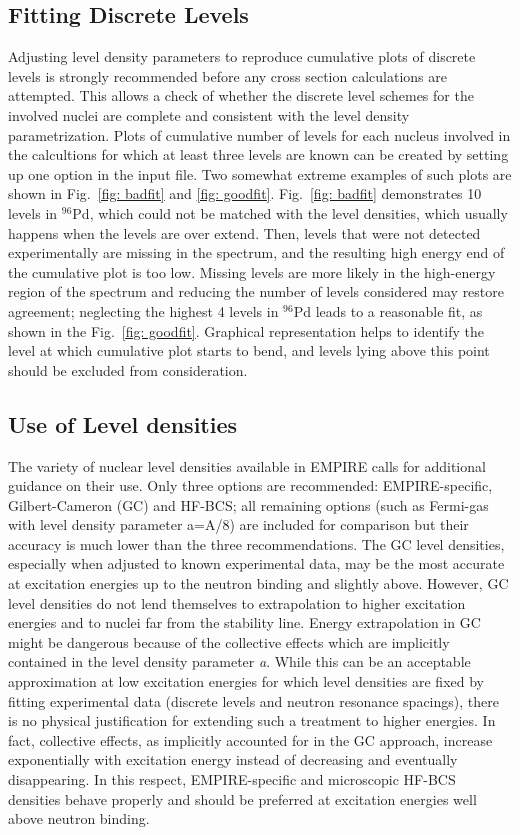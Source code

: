 \documentclass[twocolumn,amsmath,amssymb,10pt,groupedaddress,a4paper]{revtex4}
\begin{document}
\subsection{Fitting Discrete Levels}
Adjusting level density parameters to reproduce cumulative plots of discrete levels is strongly recommended before any cross section calculations are attempted. This allows a check of whether the discrete level schemes for the involved nuclei are complete and consistent with the level density parametrization. Plots of cumulative number of levels for each nucleus involved in the calcultions for which at least three levels are known can be created by setting up one option in the input file. Two somewhat extreme examples of such plots are shown in Fig.~\ref{fig: badfit} and \ref{fig: goodfit}. Fig.~\ref{fig: badfit} demonstrates 10 levels in $^{96}$Pd, which could not be matched with the level densities, which usually happens when the levels are over extend. Then, levels that were not detected experimentally are missing in the spectrum, and the resulting high energy end of the cumulative plot is too low. Missing levels are more likely in the high-energy region of the spectrum and reducing the number of levels considered may restore agreement; neglecting the highest 4 levels in $^{96}$Pd leads to a reasonable fit, as shown in the Fig.~\ref{fig: goodfit}. Graphical representation helps to identify the level at which cumulative plot starts to bend, and levels lying above this point should be excluded from consideration.

\subsection{Use of Level densities}
The variety of nuclear level densities available in EMPIRE calls for additional guidance on their use. Only three options are recommended: EMPIRE-specific, Gilbert-Cameron (GC) and HF-BCS; all remaining options (such as Fermi-gas with level density parameter a=A/8) are included for comparison but their accuracy is much lower than the three recommendations. The GC level densities, especially when adjusted to known experimental data, may be the most accurate at excitation energies up to the neutron binding and slightly above. However, GC level densities do not lend themselves to extrapolation to higher excitation energies and to nuclei far from the stability line. Energy extrapolation in GC might be dangerous because of the collective effects which are implicitly contained in the level density parameter \textit{a}. While this can be an acceptable approximation at low excitation energies for which level densities are fixed by fitting experimental data (discrete levels and neutron resonance spacings), there is no physical justification for extending such a treatment to higher energies. In fact, collective effects, as implicitly accounted for in the GC approach, increase exponentially with excitation energy instead of decreasing and eventually disappearing. In this respect, EMPIRE-specific and microscopic HF-BCS densities behave properly and should be preferred at excitation energies well above neutron binding.
\end{document}
